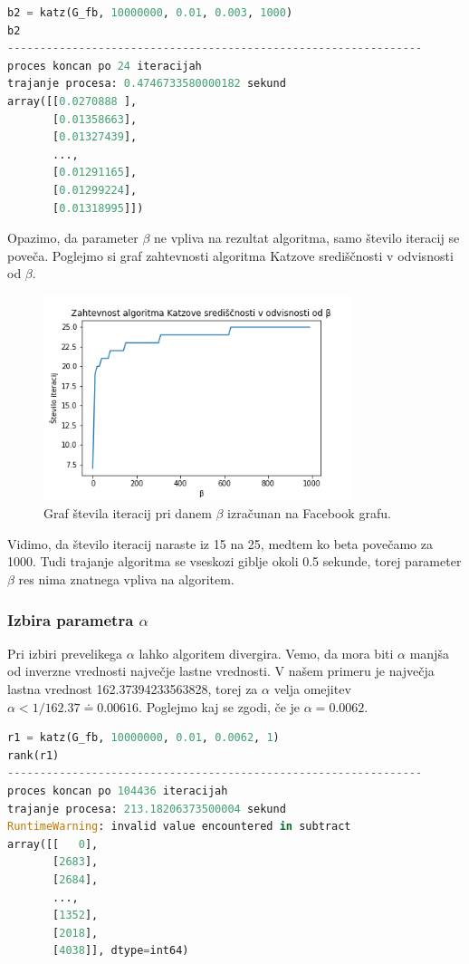 \documentclass[12pt,a4paper]{amsart}
\begin{document}
\begin{lstlisting}[language=Python]
b2 = katz(G_fb, 10000000, 0.01, 0.003, 1000)
b2
----------------------------------------------------------------
proces koncan po 24 iteracijah
trajanje procesa: 0.4746733580000182 sekund
array([[0.0270888 ],
       [0.01358663],
       [0.01327439],
       ...,
       [0.01291165],
       [0.01299224],
       [0.01318995]])
\end{lstlisting}

Opazimo, da parameter $\beta$ ne vpliva na rezultat algoritma, samo število iteracij se poveča. Poglejmo si graf zahtevnosti algoritma Katzove središčnosti v odvisnosti od $\beta.$

\begin{figure}[h]
\begin{center} 
\includegraphics[width=9cm]{Katz_beta.png}
\caption[Zahtevnost algoritma Katzove središčnosti glede na $\beta$]{Graf števila iteracij pri danem $\beta$ izračunan na Facebook grafu.}
\end{center}
\end{figure}

Vidimo, da število iteracij naraste iz 15 na 25, medtem ko beta povečamo za 1000. Tudi trajanje algoritma se vseskozi giblje okoli 0.5 sekunde, torej parameter $\beta$ res nima znatnega vpliva na algoritem.

\subsubsection{Izbira parametra $\alpha$}
Pri izbiri prevelikega $\alpha$ lahko algoritem divergira. Vemo, da mora biti $\alpha$ manjša od inverzne vrednosti največje lastne vrednosti. V našem primeru je največja lastna vrednost 162.37394233563828, torej za $\alpha$ velja omejitev $\alpha < 1/162.37 \doteq 0.00616.$ Poglejmo kaj se zgodi, če je $\alpha = 0.0062.$

\begin{lstlisting}[language=Python]
r1 = katz(G_fb, 10000000, 0.01, 0.0062, 1)
rank(r1)
----------------------------------------------------------------
proces koncan po 104436 iteracijah
trajanje procesa: 213.18206373500004 sekund
RuntimeWarning: invalid value encountered in subtract
array([[   0],
       [2683],
       [2684],
       ...,
       [1352],
       [2018],
       [4038]], dtype=int64)
\end{lstlisting}
\end{document}
